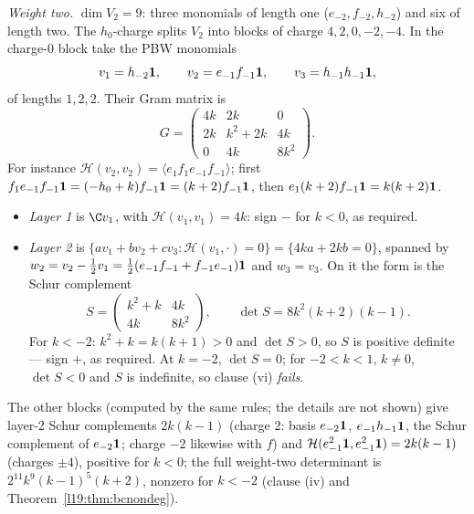 \begin{example}
\emph{Weight two.} $\dim V_2 = 9$: three monomials of length one ($e_{-2},f_{-2},h_{-2}$) and six of length two. The
$h_0$-charge splits $V_2$ into blocks of charge $4,2,0,-2,-4$. In the charge-$0$ block take the PBW monomials
\begin{equation*}
  v_1 = h_{-2}\mathbf{1},\qquad v_2 = e_{-1}f_{-1}\mathbf{1},\qquad v_3 = h_{-1}h_{-1}\mathbf{1},
\end{equation*}
of lengths $1,2,2$. Their Gram matrix is
\begin{equation*}
  G = \begin{pmatrix} 4k & 2k & 0\\ 2k & k^2+2k & 4k\\ 0 & 4k & 8k^2\end{pmatrix}.
\end{equation*}
For instance $\mathcal H(v_2,v_2) = \langle e_1f_1e_{-1}f_{-1}\rangle$; first
$f_1e_{-1}f_{-1}\mathbf{1} = (-h_0+k)f_{-1}\mathbf{1} = (k+2)f_{-1}\mathbf{1}$, then $e_1(k+2)f_{-1}\mathbf{1} = k(k+2)\mathbf{1}$.
\begin{itemize}
\item \emph{Layer 1} is $\C v_1$, with $\mathcal H(v_1,v_1) = 4k$: sign $-$ for $k<0$, as required.
\item \emph{Layer 2} is $\{av_1+bv_2+cv_3 : \mathcal H(v_1,\cdot) = 0\} = \{4ka+2kb = 0\}$, spanned by
  $w_2 = v_2-\tfrac12v_1 = \tfrac12(e_{-1}f_{-1}+f_{-1}e_{-1})\mathbf{1}$ and $w_3 = v_3$. On it the form is the Schur complement
  \begin{equation*}
    S = \begin{pmatrix} k^2+k & 4k\\ 4k & 8k^2\end{pmatrix},\qquad \det S = 8k^2(k+2)(k-1).
  \end{equation*}
  For $k<-2$: $k^2+k = k(k+1)>0$ and $\det S>0$, so $S$ is positive definite --- sign $+$, as required. At $k = -2$,
  $\det S = 0$; for $-2<k<1$, $k\ne0$, $\det S<0$ and $S$ is indefinite, so clause (vi) \emph{fails}.
\end{itemize}
The other blocks (computed by the same rules; the details are not shown) give layer-2 Schur complements $2k(k-1)$
(charge $2$: basis $e_{-2}\mathbf{1}$, $e_{-1}h_{-1}\mathbf{1}$, the Schur complement of $e_{-2}\mathbf{1}$; charge $-2$
likewise with $f$) and
$\mathcal H(e_{-1}^2\mathbf{1},e_{-1}^2\mathbf{1}) = 2k(k-1)$ (charges $\pm4$), positive for $k<0$; the full weight-two determinant is
$2^{11}k^9(k-1)^5(k+2)$, nonzero for $k<-2$ (clause (iv) and Theorem~\ref{l19:thm:bcnondeg}).


\end{example}
